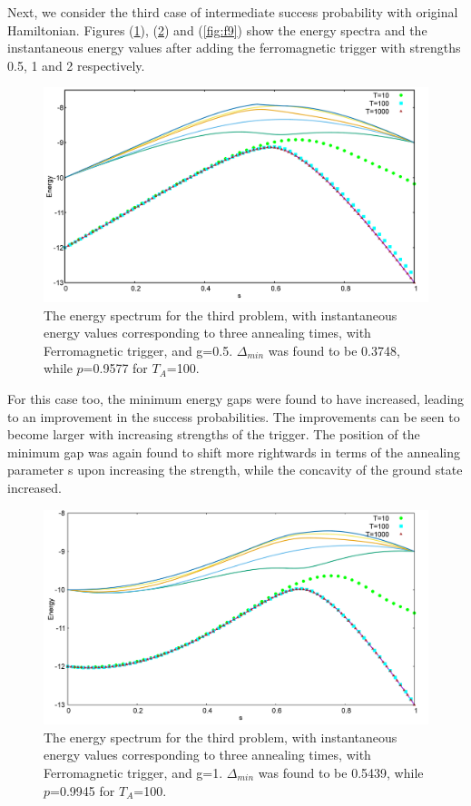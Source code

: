 \documentclass[12]{article}
\begin{document}
Next, we consider the third case of intermediate success probability with original Hamiltonian. Figures (\ref{fig:f7}), (\ref{fig:f8}) and (\ref{fig:f9}) show the energy spectra and the instantaneous energy values after adding the ferromagnetic trigger with strengths 0.5, 1 and 2 respectively.
\begin{figure}[H]
\centering 
\includegraphics[scale=0.3]{528_s12_F_g0.png}
\caption{The energy spectrum for the third problem, with instantaneous energy values corresponding to three annealing times, with Ferromagnetic trigger, and g=0.5. $\Delta_{min}$ was found to be 0.3748, while $p$=0.9577 for $T_A$=100.}
\label{fig:f7}
\end{figure}
For this case too, the minimum energy gaps were found to have increased, leading to an improvement in the success probabilities. The improvements can be seen to become larger with increasing strengths of the trigger. The position of the minimum gap was again found to shift more rightwards in terms of the annealing parameter s upon increasing the strength, while the concavity of the ground state increased. \\
\begin{figure}[H]
\centering 
\includegraphics[scale=0.3]{528_s12_F_g1.png}
\caption{The energy spectrum for the third problem, with instantaneous energy values corresponding to three annealing times, with Ferromagnetic trigger, and g=1. $\Delta_{min}$ was found to be 0.5439, while $p$=0.9945 for $T_A$=100.}
\label{fig:f8}
\end{figure}
\end{document}
